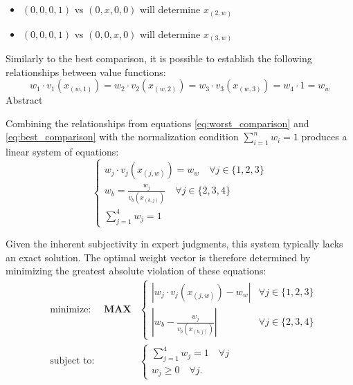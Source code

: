 \begin{itemize}
\item $(0,0,0,1)$ vs $(0,x,0,0)$ will determine $x_{(2,w)}$
\item $(0,0,0,1)$ vs $(0,0,x,0)$ will determine $x_{(3,w)}$
\end{itemize}

Similarly to the best comparison, it is possible to establish the following relationships between value functions:
\begin{equation}
   \label{eq:worst_comparison}
   w_1 \cdot v_1(x_{(w,1)}) = w_2 \cdot v_2(x_{(w,2)}) = w_3 \cdot v_3(x_{(w,3)}) = w_4 \cdot 1 = w_w
\end{equation}Abstract


Combining the relationships from equations \ref{eq:worst_comparison} and \ref{eq:best_comparison} with the normalization condition $\sum_{i=1}^{n} w_i = 1$ produces a linear system of equations:
\begin{equation}
   \begin{cases}
      w_j \cdot v_j(x_{(j,w)}) = w_w\quad \forall j \in \{1,2,3\} \\
      w_b = \frac{w_j}{v_b(x_{(b,j)})}\quad \forall j \in \{2,3,4\} \\
      \sum_{j=1}^{4} w_j = 1
   \end{cases}
\end{equation}

Given the inherent subjectivity in expert judgments, this system typically lacks an exact solution. The optimal weight vector is therefore determined by minimizing the greatest absolute violation of these equations:
\begin{equation}
   \begin{aligned}
   &\text{minimize: } \quad \textbf{MAX}
   & \begin{cases}
         |w_j \cdot v_j(x_{(j,w)}) - w_w| & \forall j \in \{1,2,3\} \\
         |w_b - \frac{w_j}{v_b(x_{(b,j)})}| & \forall j \in \{2,3,4\}
   \end{cases}\\
   & \text{subject to:}
   & \begin{cases}
      \sum_{j=1}^{4} w_j = 1 \quad \forall j \\
      w_j \geq 0 \quad \forall j.
   \end{cases}
   \end{aligned}
\end{equation}

